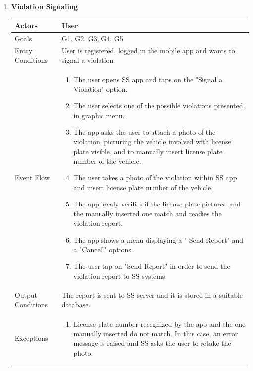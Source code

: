\begin{enumerate}
	\item \textbf{Violation Signaling}
		\begin{table}[h!]
		\begin{tabular}{|l|p{}|}
		\hline
		Actors            			&       	User\\ \hline
		Goals             			&         G1, G2, G3, G4, G5	\\ \hline
		Entry Conditions  	&  		User is registered, logged in the mobile app and wants to signal a violation\\ \hline
		Event Flow        		&          
				\begin{enumerate}[label=\alph*)]
					\item The user opens SS app and taps on the "Signal a Violation" option.
					\item The user selects one of the possible violations presented in graphic menu.
					\item The app asks the user to attach a photo of the violation, picturing the vehicle involved with license plate visible, and to manually insert license plate number of the vehicle.
					\item The user takes a photo of the violation within SS app and insert license plate number of the vehicle.
					\item The app localy verifies if the license plate pictured and the manually inserted one match and readies the violation report. 
					\item The app shows a menu displaying a " Send Report" and a "Cancell" options.
					\item The user tap on "Send Report" in order to send the violation report to SS systems.
					\end{enumerate}\\ \hline
		Output Conditions &    		The report is sent to SS server and it is stored in a suitable database.\\ \hline
		Exceptions        		&       	
				\begin{enumerate}[label=\alph*)]
					\item License plate number recognized by the app and the one manually inserted do not match. In this case, an error message is raised and SS asks the user to retake the photo.
				\end{enumerate}\\ \hline
	\end{tabular}
	\end{table}
	

\end{enumerate}
